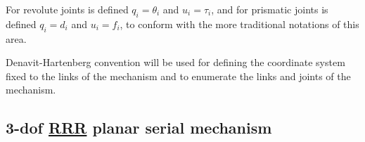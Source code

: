 \documentclass[a4paper,11pt,brazil,fleqn]{article}
\begin{document}
For revolute joints is defined $q_i = \theta_i$ and $u_i = \tau_i$, and for prismatic joints is defined $q_i = d_i$ and $u_i = f_i$, to conform with the more traditional notations of this area.

Denavit-Hartenberg convention will be used for defining the coordinate system fixed to the links of the mechanism and to enumerate the links and joints of the mechanism.

\subsection{3-dof \underline{RRR} planar serial mechanism}\label{S03-1}
\end{document}
